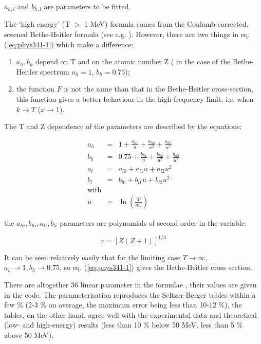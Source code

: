 $a_{h,l}$ and $b_{h,l}$ are parameters to be fitted.

The `high energy' (T $>$  1 MeV) formula comes from the
Coulomb-corrected, sceened Bethe-Heitler formula (see e.g.
\cite{ebrem.williams,ebrem.butcher,ebrem.egs4}). However, there are two things in eq.
(\ref{eq:phys341-1}) which make a difference:

\begin{enumerate}
\item $a_{h}, b_{h}$ depend on T and on the atomic number Z ( in the case
of the Bethe-Heitler spectrum $a_{h} = 1$, $b_{h} =0.75$);
\item the function $F$ is not the same than that in the Bethe-Heitler
cross-section, this function gives a better behaviour in the
high frequency limit, i.e. when $k \rightarrow T$  ($x \rightarrow 1$).
\end{enumerate}

The T and Z dependence of the parameters are described by the equations:

\begin{eqnarray*}
a_{h} & = & 1 + \frac{a_{h1}}{u}+\frac{a_{h2}}{u^{2}}+\frac{a_{h3}}{u^{3}} \\
b_{h} & = & 0.75+\frac{b_{h1}}{u}+\frac{b_{h2}}{u^{2}}+\frac{b_{h3}}{u^{3}} \\
a_{l} & = & a_{l0} + a_{l1} u + a_{l2} u^{2} \\
b_{l} & = & b_{l0} + b_{l1} u + b_{l2} u^{2} \\
\mbox{with} \\
u & = & \ln \left ( \frac{T}{m_{e}} \right )
\end{eqnarray*}

the $a_{hi}, b_{hi}, a_{li}, b_{li}$ parameters are polynomials of second order
in the variable:

\[
v = [Z (Z+1)]^{1/3}
\]

It can be seen relatively easily that for the limiting case $T \rightarrow
\infty$, $a_{h} \rightarrow 1, b_{h} \rightarrow 0.75$,
so eq. (\ref{eq:phys341-1}) gives the Bethe-Heitler cross section.

There are altogether 36 linear parameter in the formulae , their
values are given in the code. The parameterisation reproduces
the Seltzer-Berger tables within a few \% (2-3 \% on average,
the maximum error being less than 10-12 \%), the tables, on the other hand,
agree well with the experimental data and theoretical (low- and high-energy)
results (less than 10 \% below 50 MeV, less than 5 \% above 50 MeV).


